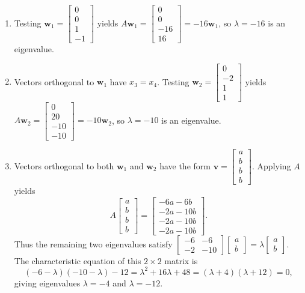 \documentclass[11pt, letterpaper]{article}
\theoremstyle{definition}
\theoremstyle{remark}
\begin{document}
\begin{enumerate}[label=(\arabic*)]
    \item Testing $\mathbf{w}_1 = \begin{bmatrix} 0 \\ 0 \\ 1 \\ -1 \end{bmatrix}$ yields $A\mathbf{w}_1 = \begin{bmatrix} 0 \\ 0 \\ -16 \\ 16 \end{bmatrix} = -16\mathbf{w}_1$, so $\lambda = -16$ is an eigenvalue.
    \item Vectors orthogonal to $\mathbf{w}_1$ have $x_3 = x_4$. Testing $\mathbf{w}_2 = \begin{bmatrix} 0 \\ -2 \\ 1 \\ 1 \end{bmatrix}$ yields $A\mathbf{w}_2 = \begin{bmatrix} 0 \\ 20 \\ -10 \\ -10 \end{bmatrix} = -10\mathbf{w}_2$, so $\lambda = -10$ is an eigenvalue.
    \item Vectors orthogonal to both $\mathbf{w}_1$ and $\mathbf{w}_2$ have the form $\mathbf{v} = \begin{bmatrix} a \\ b \\ b \\ b \end{bmatrix}$. Applying $A$ yields
    \[
    A\begin{bmatrix} a \\ b \\ b \\ b \end{bmatrix} = \begin{bmatrix} -6a - 6b \\ -2a - 10b \\ -2a - 10b \\ -2a - 10b \end{bmatrix}.
    \]
    Thus the remaining two eigenvalues satisfy $\begin{bmatrix} -6 & -6 \\ -2 & -10 \end{bmatrix} \begin{bmatrix} a \\ b \end{bmatrix} = \lambda \begin{bmatrix} a \\ b \end{bmatrix}$. The characteristic equation of this $2 \times 2$ matrix is
    \[
    (-6 - \lambda)(-10 - \lambda) - 12 = \lambda^2 + 16\lambda + 48 = (\lambda + 4)(\lambda + 12) = 0,
    \]
    giving eigenvalues $\lambda = -4$ and $\lambda = -12$.
\end{enumerate}
\end{document}
